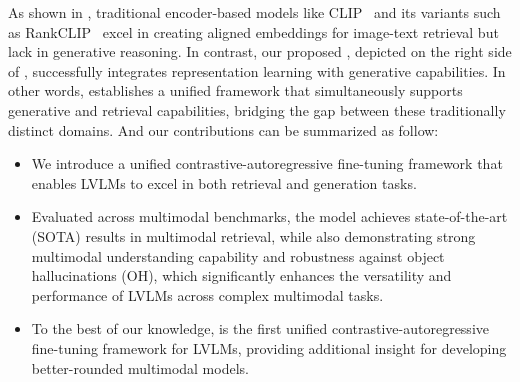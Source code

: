 As shown in , traditional encoder-based models like CLIP~\citep{radford2021learning} and its variants such as RankCLIP~\citep{zhang2024rankclip} excel in creating aligned embeddings for image-text retrieval but lack in generative reasoning.
%
In contrast, our proposed \algname, depicted on the right side of , successfully integrates representation learning with generative capabilities.
%
In other words, \algname establishes a unified framework that simultaneously supports generative and retrieval capabilities, bridging the gap between these traditionally distinct domains.
%
And our contributions can be summarized as follow:
\begin{itemize}
    \item We introduce a unified contrastive-autoregressive fine-tuning framework that enables LVLMs to excel in both retrieval and generation tasks.
    \item Evaluated across multimodal benchmarks, the model achieves state-of-the-art (SOTA) results in multimodal retrieval, while also demonstrating strong multimodal understanding capability and robustness against object hallucinations (OH), which significantly enhances the versatility and performance of LVLMs across complex multimodal tasks.
    \item To the best of our knowledge, \algname is the first unified contrastive-autoregressive fine-tuning framework for LVLMs,
    providing additional insight for developing better-rounded multimodal models.
\end{itemize}
%


